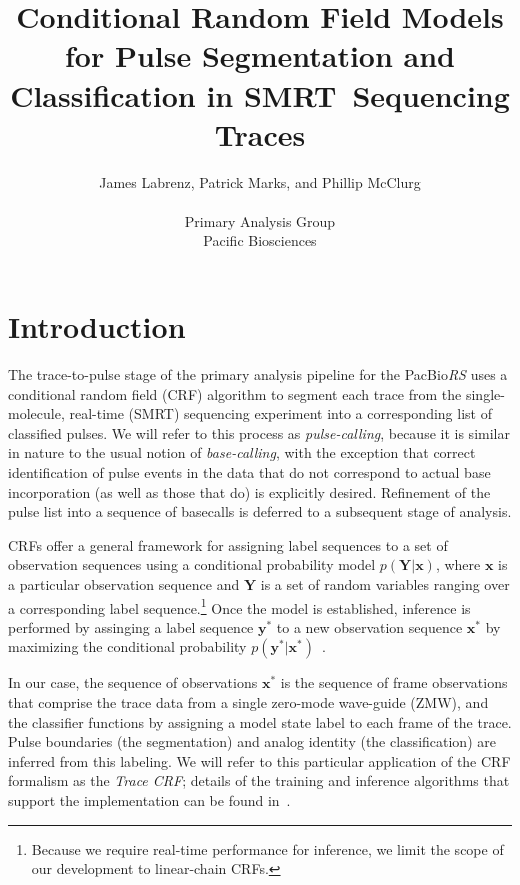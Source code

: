 \documentclass[10pt]{article}
\title{Conditional Random Field Models for Pulse Segmentation and Classification in SMRT\texttrademark\ Sequencing Traces}
\author{James Labrenz, Patrick Marks, and Phillip McClurg\\\\
Primary Analysis Group\\
Pacific Biosciences}
\newcommand{\crf}{{\small CRF}}
\newcommand{\tcrf}{Trace {\small CRF}}
\newcommand{\zmw}{{\small ZMW}}
\newcommand{\smrt}{{\small SMRT\texttrademark}}
\newcommand{\theRS}{the PacBio\hspace{2 pt}\textit{RS}}
\begin{document}
\maketitle

\section{Introduction}

The trace-to-pulse stage of the primary analysis pipeline for \theRS{} uses a conditional random field (\crf{}) algorithm to segment each trace from the single-molecule, real-time (\smrt{}) sequencing experiment into a corresponding list of classified pulses.
We will refer to this process as \emph{pulse-calling}, because it is similar in nature to the usual notion of \emph{base-calling}, with the exception that correct identification of pulse events in the data that do not correspond to actual base incorporation (as well as those that do) is explicitly desired.  Refinement of the pulse list into a sequence of basecalls is deferred to a subsequent stage of analysis.

\crf{}s offer a general framework for assigning label sequences to a set of observation sequences using a conditional probability model $p(\mathbf{Y}|\mathbf{x})$, where $\mathbf{x}$ is a particular observation sequence and $\mathbf{Y}$ is a set of random variables ranging over a corresponding label sequence.\footnote{Because we require real-time performance for inference, we limit the scope of our development to linear-chain CRFs.}  Once the model is established, inference is performed by assinging a label sequence $\mathbf{y^*}$ to a new observation sequence $\mathbf{x^*}$ by maximizing the conditional probability $p(\mathbf{y^*}|\mathbf{x^*})$~\cite{Lafferty,Wallach2004,Gupta}.

In our case, the sequence of observations $\mathbf{x^*}$ is the sequence of frame observations that comprise the trace data from a single zero-mode wave-guide (\zmw), and the classifier functions by assigning a model state label to each frame of the trace.  
Pulse boundaries (the segmentation) and analog identity (the classification) are inferred from this labeling.  We will refer to this particular application of the \crf{} formalism as the \emph{\tcrf};
details of the training and inference algorithms that support the implementation can be found in~\cite{McClurg2009}.
\end{document}
